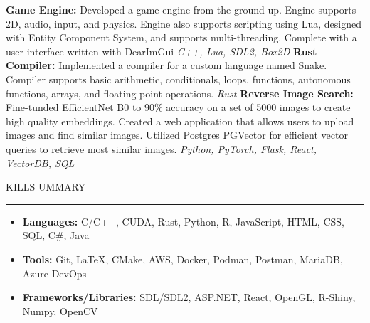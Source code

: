 \documentclass[11pt]{article}
\begin{document}
\textbf{Game Engine:} Developed a game engine from the ground up. Engine supports 2D, audio, input, and physics. Engine also supports scripting using Lua, designed with Entity Component System, and supports multi-threading. Complete with a user interface written with DearImGui   \hfill 
\textit{C++, Lua, SDL2, Box2D}
\newline
\textbf{Rust Compiler:} Implemented a compiler for a custom language named Snake. Compiler supports basic arithmetic, conditionals, loops, functions, autonomous functions, arrays, and floating point operations. \hfill \textit{Rust}
\newline
\textbf{Reverse Image Search:} Fine-tunded EfficientNet B0 to 90\% accuracy on a set of 5000 images to create high quality embeddings. Created a web application that allows users to upload images and find similar images. Utilized Postgres PGVector for efficient vector queries to retrieve most similar images. \hfill \textit{Python, PyTorch, Flask, React, VectorDB, SQL}
\newline

\par \scalebox{1.3}{S}KILLS \scalebox{1.3}{S}UMMARY                  
\par \vspace{-0.1in} \noindent\rule{7.8in}{0.5pt} 

\begin{itemize}
    \item \textbf{Languages:} \hspace*{3cm} C/C++, CUDA, Rust, Python, R, JavaScript, HTML, CSS, SQL, C\#, Java
    \item \textbf{Tools:} \hspace*{4cm} Git, \LaTeX, CMake, AWS, Docker, Podman, Postman, MariaDB, Azure DevOps
    \item \textbf{Frameworks/Libraries:} \hspace*{0.9cm}SDL/SDL2, ASP.NET, React, OpenGL, R-Shiny, Numpy, OpenCV
\end{itemize}
\end{document}
